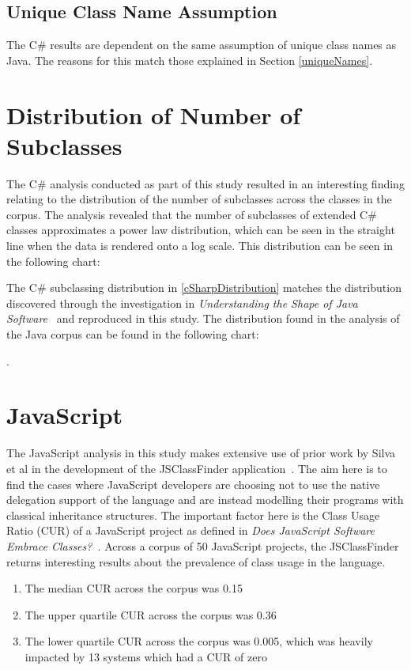 \subsection{Unique Class Name Assumption}
The C\# results are dependent on the same assumption of unique class names as Java. The reasons for this match those explained in Section \ref{uniqueNames}.

\section{Distribution of Number of Subclasses}
The C\# analysis conducted as part of this study resulted in an interesting finding relating to the distribution of the number of subclasses across the classes in the corpus. The analysis revealed that the number of subclasses of extended C\# classes approximates a power law distribution, which can be seen in the straight line when the data is rendered onto a log scale. This distribution can be seen in the following chart:



The C\# subclassing distribution in \ref{cSharpDistribution} matches the distribution discovered through the investigation in \textit{Understanding the Shape of Java Software}~\cite{ShapeOfJava} and reproduced in this study. The distribution found in the analysis of the Java corpus can be found in the following chart: 

.

\section{JavaScript}
The JavaScript analysis in this study makes extensive use of prior work by Silva et al in the development of the JSClassFinder application~\cite{JSClassFinder}. The aim here is to find the cases where JavaScript developers are choosing not to use the native delegation support of the language and are instead modelling their programs with classical inheritance structures. The important factor here is the Class Usage Ratio (CUR) of a JavaScript project as defined in \textit{Does JavaScript Software Embrace Classes?~\cite{JSClassFinder}}. Across a corpus of 50 JavaScript projects, the JSClassFinder returns interesting results about the prevalence of class usage in the language.
\begin{enumerate}
	\item The median CUR across the corpus was 0.15
	\item The upper quartile CUR across the corpus was 0.36
	\item The lower quartile CUR across the corpus was 0.005, which was heavily impacted by 13 systems which had a CUR of zero
\end{enumerate}

